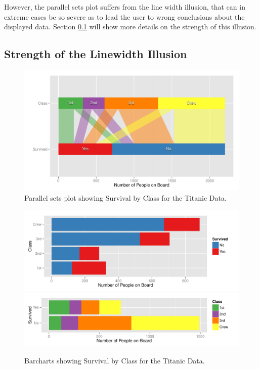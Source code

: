 However, the parallel sets plot suffers from the line width illusion, that can in extreme cases be so severe as to lead the user to wrong conclusions about the displayed data.  Section \ref{distortion} will show more details on the strength of this illusion.


\subsection{Strength of the Linewidth Illusion}\label{distortion}
\begin{figure}[hbtp]
\centering
\includegraphics[width=.9\linewidth]{images/parset-titanic}
\caption{\label{question1a} Parallel sets plot showing Survival by Class for the Titanic Data. }
\end{figure}

\begin{figure}[hbtp]
\begin{center}
\includegraphics[width=.8\linewidth]{images/bar1-titanic}
\includegraphics[width=.8\linewidth]{images/bar2-titanic}
\end{center}
\caption{\label{question1b} Barcharts showing Survival by Class for the Titanic Data.}
\end{figure}



